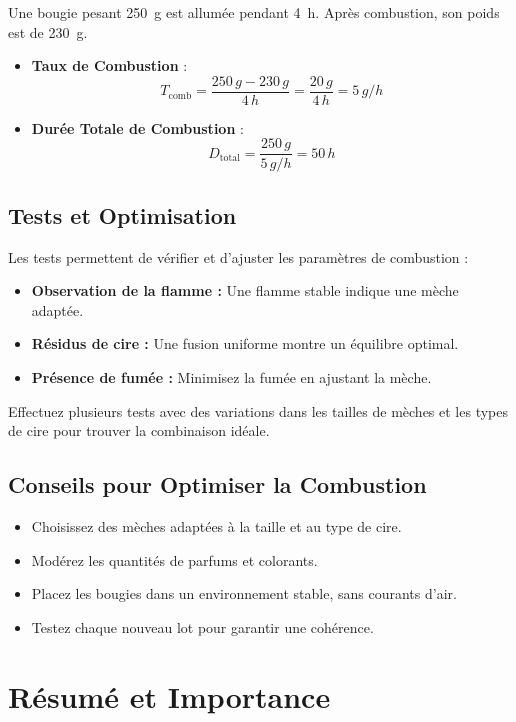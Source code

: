 \documentclass[11pt,fleqn,onecolumn,oneside]{book}
\begin{document}
Une bougie pesant \SI{250}{\gram} est allumée pendant \SI{4}{\hour}. Après combustion, son poids est de \SI{230}{\gram}.
\begin{itemize}
    \item \textbf{Taux de Combustion} :
    \[
    T_{\text{comb}} = \frac{250\,g - 230\,g}{4\,h} = \frac{20\,g}{4\,h} = 5\,g/h
    \]
    \item \textbf{Durée Totale de Combustion} :
    \[
    D_{\text{total}} = \frac{250\,g}{5\,g/h} = 50\,h
    \]
\end{itemize}

\subsection*{Tests et Optimisation}

Les tests permettent de vérifier et d’ajuster les paramètres de combustion :
\begin{itemize}
    \item \textbf{Observation de la flamme :} Une flamme stable indique une mèche adaptée.
    \item \textbf{Résidus de cire :} Une fusion uniforme montre un équilibre optimal.
    \item \textbf{Présence de fumée :} Minimisez la fumée en ajustant la mèche.
\end{itemize}

\begin{exercise}
Effectuez plusieurs tests avec des variations dans les tailles de mèches et les types de cire pour trouver la combinaison idéale.
\end{exercise}

\subsection*{Conseils pour Optimiser la Combustion}

\begin{itemize}
    \item Choisissez des mèches adaptées à la taille et au type de cire.
    \item Modérez les quantités de parfums et colorants.
    \item Placez les bougies dans un environnement stable, sans courants d’air.
    \item Testez chaque nouveau lot pour garantir une cohérence.
\end{itemize}

\section{Résumé et Importance}
\end{document}
